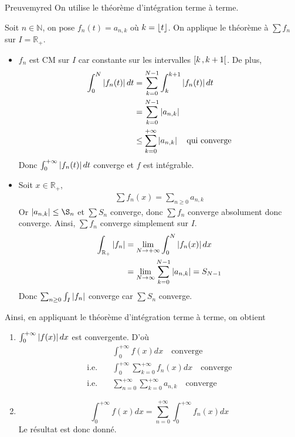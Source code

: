     \begin{demo}{Preuve}{myred}
        On utilise le théorème d’intégration terme à terme. 

        Soit $n \in \mathbb{N}$, on pose $f_n(t) = a_{n,k}$ où $k = \left\lfloor t \right\rfloor$. On applique le théorème à $\sum f_n$ sur $I = \mathbb{R}_+$.
        \begin{itemize}
            \item $f_n$ est CM sur $I$ car constante sur les intervalles $\left[ k \, , k+1 \right[$. De plus, 
            \begin{align*}
                \int_{0}^{N} \left\lvert f_n(t)\right\rvert dt 
                &= \sum_{k=0}^{N-1} \int_{k}^{k+1} \left\lvert f_n(t)\right\rvert dt \\
                &= \sum_{k=0}^{N-1} \left\lvert a_{n,k}\right\rvert \\
                &\leq \sum_{k=0}^{+\infty} \left\lvert a_{n,k}\right\rvert \quad \text{qui converge}
            \end{align*}
            Donc $\int_{0}^{+\infty} \left\lvert f_n(t)\right\rvert dt$ converge et $f$ est intégrable.
            \item Soit $x \in \mathbb{R}_+$, 
            \begin{align*}
                \sum f_n(x) = \sum_{n \geq 0} a_{n,k}
            \end{align*}
            Or $\abs{a_{n,k}} \leq \S_n$ et $\sum S_n$ converge, donc $\sum f_n$ converge absolument donc converge. Ainsi, $\sum f_n$ converge simplement sur $I$.
            \begin{align*}
                \int_{\mathbb{R}_+} \left\lvert f_n\right\rvert 
                &= \lim_{N \to +\infty} \int_{0}^{N} \left\lvert f_n(x)\right\rvert dx \\
                &= \lim_{N \to \infty} \sum_{k=0}^{N-1} \left\lvert a_{n,k}\right\rvert = S_{N-1}
            \end{align*}
            Donc $\sum_{n \geq 0} \int_I \left\lvert f_n\right\rvert$ converge car $\sum S_n$ converge.
        \end{itemize}
        Ainsi, en appliquant le théorème d’intégration terme à terme, on obtient 
        \begin{enumerate}
            \item $\int_{0}^{+\infty}\left\lvert f(x)\right\rvert dx$ est convergente. D’où
            \begin{align*}
                &\int_{0}^{+\infty} f(x)dx \quad \text{converge} \\
                \text{i.e.} \quad & \int_{0}^{+\infty} \sum_{k=0}^{+\infty} f_n(x) dx \quad \text{converge} \\
                \text{i.e.} \quad & \sum_{n=0}^{+\infty} \sum_{k=0}^{+\infty} a_{n,k} \quad \text{converge}
            \end{align*}
            \item \[ \int_{0}^{+\infty} f(x)dx = \sum_{n=0}^{+\infty} \int_{0}^{+\infty} f_n(x)dx \]  
            Le résultat est donc donné.
        \end{enumerate}
    \end{demo}

